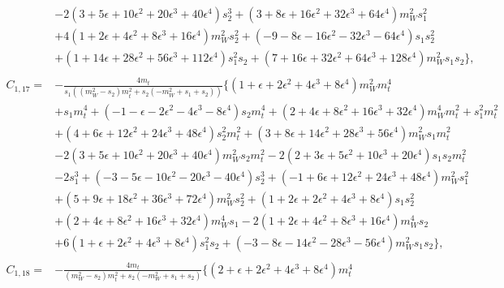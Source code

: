 \documentclass[twocolumn,aps,showpacs,nofootinbib,superscriptaddress,prd]{revtex4-2}
\begin{document}
\begin{widetext}
\begin{align}
\nonumber\\&
-2\left(3 +5 \epsilon +10 \epsilon^2 +20 \epsilon^3 +40 \epsilon^4\right)s_2^3+\left(3 +8 \epsilon +16 \epsilon^2 +32 \epsilon^3 +64 \epsilon^4\right)m_W^2s_1^2
\nonumber\\&
+4\left(1 +2 \epsilon +4 \epsilon^2 +8 \epsilon^3 +16 \epsilon^4\right)m_W^2s_2^2+\left(-9 -8 \epsilon -16 \epsilon^2 -32 \epsilon^3 -64 \epsilon^4\right)s_1s_2^2
\nonumber\\&
+\left(1 +14 \epsilon +28 \epsilon^2 +56 \epsilon^3 +112 \epsilon^4\right)s_1^2s_2+\left(7 +16 \epsilon +32 \epsilon^2 +64 \epsilon^3 +128 \epsilon^4\right)m_W^2s_1s_2\}
,\nonumber\\
\nonumber\\
C_{1,17}=&-\frac{4m_t}{s_1\left(\left(m_W^2-s_2\right)m_t^2+s_2\left(-m_W^2+s_1+s_2\right)\right)}\{\left(1 +\epsilon +2 \epsilon^2 +4 \epsilon^3 +8 \epsilon^4\right)m_W^2m_t^4
\nonumber\\&
+s_1m_t^4+\left(-1 -\epsilon -2 \epsilon^2 -4 \epsilon^3 -8 \epsilon^4\right)s_2m_t^4+\left(2 +4 \epsilon +8 \epsilon^2 +16 \epsilon^3 +32 \epsilon^4\right)m_W^4m_t^2+s_1^2m_t^2
\nonumber\\&
+\left(4 +6 \epsilon +12 \epsilon^2 +24 \epsilon^3 +48 \epsilon^4\right)s_2^2m_t^2+\left(3 +8 \epsilon +14 \epsilon^2 +28 \epsilon^3 +56 \epsilon^4\right)m_W^2s_1m_t^2
\nonumber\\&
-2\left(3 +5 \epsilon +10 \epsilon^2 +20 \epsilon^3 +40 \epsilon^4\right)m_W^2s_2m_t^2-2\left(2 +3 \epsilon +5 \epsilon^2 +10 \epsilon^3 +20 \epsilon^4\right)s_1s_2m_t^2
\nonumber\\&
-2s_1^3+\left(-3 -5 \epsilon -10 \epsilon^2 -20 \epsilon^3 -40 \epsilon^4\right)s_2^3+\left(-1 +6 \epsilon +12 \epsilon^2 +24 \epsilon^3 +48 \epsilon^4\right)m_W^2s_1^2
\nonumber\\&
+\left(5 +9 \epsilon +18 \epsilon^2 +36 \epsilon^3 +72 \epsilon^4\right)m_W^2s_2^2+\left(1 +2 \epsilon +2 \epsilon^2 +4 \epsilon^3 +8 \epsilon^4\right)s_1s_2^2
\nonumber\\&
+\left(2 +4 \epsilon +8 \epsilon^2 +16 \epsilon^3 +32 \epsilon^4\right)m_W^4s_1-2\left(1 +2 \epsilon +4 \epsilon^2 +8 \epsilon^3 +16 \epsilon^4\right)m_W^4s_2
\nonumber\\&
+6\left(1 +\epsilon +2 \epsilon^2 +4 \epsilon^3 +8 \epsilon^4\right)s_1^2s_2+\left(-3 -8 \epsilon -14 \epsilon^2 -28 \epsilon^3 -56 \epsilon^4\right)m_W^2s_1s_2\}
,\nonumber\\
\nonumber\\
C_{1,18}=&-\frac{4m_t}{\left(m_W^2-s_2\right)m_t^2+s_2\left(-m_W^2+s_1+s_2\right)}\{\left(2 +\epsilon +2 \epsilon^2 +4 \epsilon^3 +8 \epsilon^4\right)m_t^4

\end{align}
\end{widetext}
\end{document}
